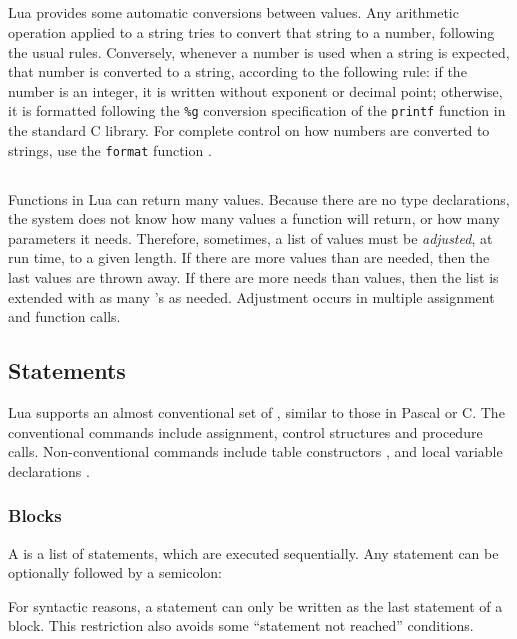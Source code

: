 \subsection{} \label{coercion}

Lua provides some automatic conversions between values.
Any arithmetic operation applied to a string tries to convert
that string to a number, following the usual rules.
Conversely, whenever a number is used when a string is expected,
that number is converted to a string, according to the following rule:
if the number is an integer, it is written without exponent or decimal point;
otherwise, it is formatted following the \verb|%g|
conversion specification of the \verb|printf| function in the
standard C library.
For complete control on how numbers are converted to strings,
use the \verb|format| function .


\subsection{} \label{adjust}

Functions in Lua can return many values.
Because there are no type declarations,
the system does not know how many values a function will return,
or how many parameters it needs.
Therefore, sometimes, a list of values must be \emph{adjusted}, at run time,
to a given length.
If there are more values than are needed, then the last values are thrown away.
If there are more needs than values, then the list is extended with as
many  \nil's as needed.
Adjustment occurs in multiple assignment and function calls.


\subsection{Statements}

Lua supports an almost conventional set of ,
similar to those in Pascal or C.
The conventional commands include
assignment, control structures and procedure calls.
Non-conventional commands include table constructors
,
and local variable declarations .

\subsubsection{Blocks}
A  is a list of statements, which are executed sequentially.
Any statement can be optionally followed by a semicolon:
\begin{Produc}
\end{Produc}%
For syntactic reasons, a  statement can only be written
as the last statement of a block.
This restriction also avoids some ``statement not reached'' conditions.

